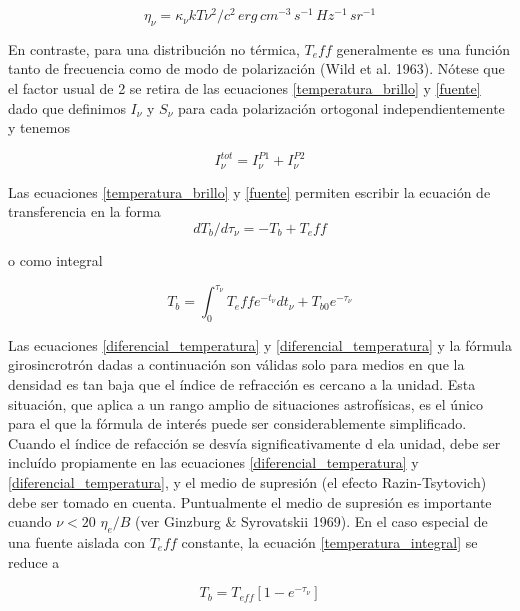 \begin{equation} \label{eta_frecuencia}
\eta_\nu = \kappa_\nu k T \nu^2/c^2 \, erg \, cm^{-3} \,s^{-1} \,Hz^{-1}\, sr^{-1}
\end{equation}

En contraste, para una distribuci\'on no t\'ermica, $T_eff$ generalmente es una funci\'on tanto de frecuencia como de modo de polarizaci\'on (Wild et al. 1963). N\'otese que el factor usual de 2 se retira de las ecuaciones \ref{temperatura_brillo} y \ref{fuente} dado que definimos $I_\nu$ y $S_\nu$ para cada polarizaci\'on ortogonal independientemente y tenemos

\begin{equation} \label{intensidad_total}
I^{tot}_\nu = I^{P1}_\nu + I^{P2}_\nu
\end{equation}

Las ecuaciones \ref{temperatura_brillo} y \ref{fuente} permiten escribir la ecuaci\'on de transferencia en la forma
\begin{equation} \label{diferencial_temperatura}
dT_b/d\tau_\nu = -T_b + T_eff
\end{equation}

o como integral

\begin{equation} \label{temperatura_integral}
T_b = \int_{0}^{\tau_\nu} T_eff e^{-t_\nu} dt_\nu + T_{b0} e^{-\tau_\nu}
\end{equation}

Las ecuaciones \ref{diferencial_temperatura} y \ref{diferencial_temperatura} y la f\'ormula girosincrotr\'on dadas a continuaci\'on son v\'alidas solo para medios en que la densidad es tan baja que el \'indice de refracci\'on es cercano a la unidad. Esta situaci\'on, que aplica a un rango amplio de situaciones astrof\'isicas, es el \'unico para el que la f\'ormula de inter\'es puede ser considerablemente simplificado. Cuando el \'indice de refacci\'on se desv\'ia significativamente d ela unidad, debe ser inclu\'ido propiamente en las ecuaciones \ref{diferencial_temperatura} y \ref{diferencial_temperatura}, y el medio de supresi\'on (el efecto Razin-Tsytovich) debe ser tomado en cuenta. Puntualmente el medio de supresi\'on es importante cuando $\nu < 20$ $\eta_e/B$ (ver Ginzburg \& Syrovatskii 1969).
En el caso especial de una fuente aislada con $T_eff$ constante, la ecuaci\'on \ref{temperatura_integral} se reduce a

\begin{equation} \label{t_brillo1}
T_b = T_{eff}[1-e^{-\tau_\nu}]
\end{equation}

